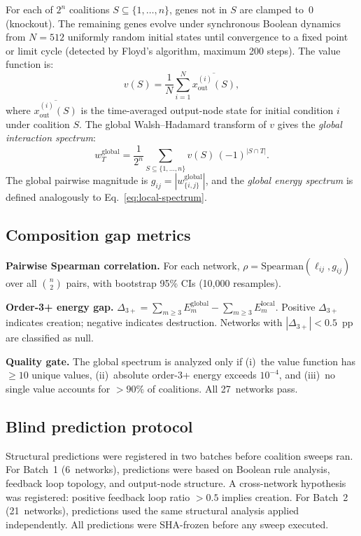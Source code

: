 \documentclass[11pt]{article}
\begin{document}
For each of $2^n$ coalitions $S \subseteq \{1,\ldots,n\}$, genes not
in $S$ are clamped to~0 (knockout). The remaining genes evolve under
synchronous Boolean dynamics from $N = 512$ uniformly random initial
states until convergence to a fixed point or limit cycle (detected by
Floyd's algorithm, maximum 200 steps). The value function is:
%
\begin{equation}
\label{eq:value}
v(S) = \frac{1}{N} \sum_{i=1}^{N}
\overline{x_{\mathrm{out}}^{(i)}(S)},
\end{equation}
%
where $\overline{x_{\mathrm{out}}^{(i)}(S)}$ is the time-averaged
output-node state for initial condition $i$ under coalition $S$. The
global Walsh--Hadamard transform of $v$ gives the \emph{global
interaction spectrum}:
%
\begin{equation}
\label{eq:global-wht}
w_T^{\mathrm{global}} = \frac{1}{2^n} \sum_{S \subseteq \{1,\ldots,n\}}
v(S)\,(-1)^{|S \cap T|}.
\end{equation}
%
The global pairwise magnitude is
$g_{ij} = |w_{\{i,j\}}^{\mathrm{global}}|$, and the
\emph{global energy spectrum} is defined analogously to
Eq.~\ref{eq:local-spectrum}.


\subsection{Composition gap metrics}
\label{sec:metrics}

\textbf{Pairwise Spearman correlation.}
For each network, $\rho = \mathrm{Spearman}(\ell_{ij}, g_{ij})$ over
all $\binom{n}{2}$ pairs, with bootstrap 95\% CIs (10{,}000
resamples).

\textbf{Order-3+ energy gap.}
$\Delta_{3+} = \sum_{m \geq 3} E_m^{\mathrm{global}}
- \sum_{m \geq 3} E_m^{\mathrm{local}}.$
Positive $\Delta_{3+}$ indicates creation; negative indicates
destruction. Networks with $|\Delta_{3+}| < 0.5$~pp are classified as
null.

\textbf{Quality gate.}
The global spectrum is analyzed only if (i)~the value function has
$\geq 10$ unique values, (ii)~absolute order-3+ energy exceeds
$10^{-4}$, and (iii)~no single value accounts for $> 90\%$ of
coalitions. All 27~networks pass.


\subsection{Blind prediction protocol}
\label{sec:blind}

Structural predictions were registered in two batches before coalition
sweeps ran. For Batch~1 (6~networks), predictions were based on
Boolean rule analysis, feedback loop topology, and output-node
structure. A cross-network hypothesis was registered: positive
feedback loop ratio $> 0.5$ implies creation. For Batch~2
(21~networks), predictions used the same structural analysis applied
independently. All predictions were SHA-frozen before any sweep
executed.
\end{document}
